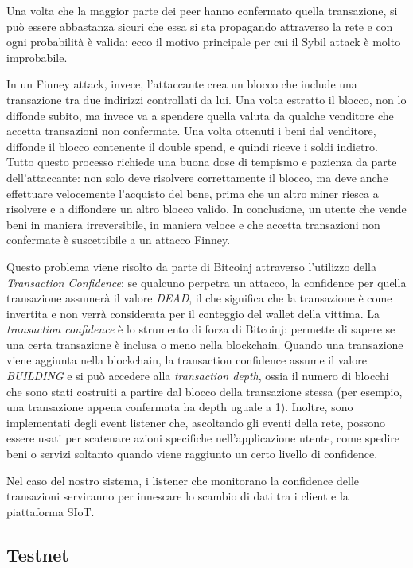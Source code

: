 Una volta che la maggior parte dei peer hanno confermato quella transazione, si può essere abbastanza sicuri che essa si sta propagando attraverso la rete e con ogni probabilità è valida: ecco il motivo principale per cui il Sybil attack è molto improbabile.

In un Finney attack, invece, l'attaccante crea un blocco che include una transazione tra due indirizzi controllati da lui. Una volta estratto il blocco, non lo diffonde subito, ma invece va a spendere quella valuta da qualche venditore che accetta transazioni non confermate. Una volta ottenuti i beni dal venditore, diffonde il blocco contenente il double spend, e quindi riceve i soldi indietro. Tutto questo processo richiede una buona dose di tempismo e pazienza da parte dell'attaccante: non solo deve risolvere correttamente il blocco, ma deve anche effettuare velocemente l'acquisto del bene, prima che un altro miner riesca a risolvere e a diffondere un altro blocco valido. In conclusione, un utente che vende beni in maniera irreversibile, in maniera veloce e che accetta transazioni non confermate è suscettibile a un attacco Finney.

Questo problema viene risolto da parte di Bitcoinj attraverso l'utilizzo della \textit{Transaction Confidence}: se qualcuno perpetra un attacco, la confidence per quella transazione assumerà il valore \textit{DEAD}, il che significa che la transazione è come invertita e non verrà considerata per il conteggio del wallet della vittima.
La \textit{transaction confidence} è lo strumento di forza di Bitcoinj: permette di sapere se una certa transazione è inclusa o meno nella blockchain. 
Quando una transazione viene aggiunta nella blockchain, la transaction confidence assume il valore \textit{BUILDING} e si può accedere alla \textit{transaction depth}, ossia il numero di blocchi che sono stati costruiti a partire dal blocco della transazione stessa (per esempio, una transazione appena confermata ha depth uguale a 1).
Inoltre, sono implementati degli event listener che, ascoltando gli eventi della rete, possono essere usati per scatenare azioni specifiche nell'applicazione utente, come spedire beni o servizi soltanto quando viene raggiunto un certo livello di confidence.

Nel caso del nostro sistema, i listener che monitorano la confidence delle transazioni serviranno per innescare lo scambio di dati tra i client e la piattaforma SIoT.


\subsection{Testnet}
\label{c:integr:lib:testnet}

